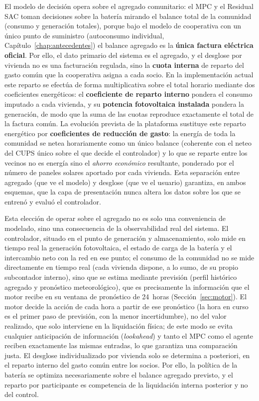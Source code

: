 \documentclass[12pt, a4paper, twoside]{report}
\begin{document}
El modelo de decisión opera sobre el agregado comunitario: el MPC y el Residual
SAC toman decisiones sobre la batería mirando el balance total de la comunidad
(consumo y generación totales), porque bajo el modelo de cooperativa con un único
punto de suministro (autoconsumo individual, Capítulo~\ref{chap:antecedentes}) el
balance agregado es la \textbf{única factura eléctrica oficial}. Por ello, el dato
primario del sistema es el agregado, y el desglose por vivienda no es una
facturación regulada, sino la \textbf{cuota interna} de reparto del gasto común
que la cooperativa asigna a cada socio. En la implementación actual este
reparto se efectúa de forma multiplicativa sobre el total horario mediante dos
coeficientes energéticos: el \textbf{coeficiente de reparto interno} pondera
el consumo imputado a cada vivienda, y su \textbf{potencia fotovoltaica
instalada} pondera la generación, de modo que la suma de las cuotas reproduce
exactamente el total de la factura común. La evolución prevista de la
plataforma sustituye este reparto energético por \textbf{coeficientes de
reducción de gasto}: la energía de toda la comunidad se netea horariamente
como un único balance (coherente con el neteo del CUPS único sobre el que
decide el controlador) y lo que se reparte entre los vecinos no es energía
sino el \emph{ahorro económico} resultante, ponderado por el número de paneles
solares aportado por cada vivienda. Esta separación entre agregado (que ve el
modelo) y desglose (que ve el usuario) garantiza, en ambos esquemas, que la
capa de presentación nunca altera los datos sobre los que se entrenó y evaluó
el controlador.

Esta elección de operar sobre el agregado no es solo una conveniencia de
modelado, sino una consecuencia de la observabilidad real del sistema. El
controlador, situado en el punto de generación y almacenamiento, solo mide en
tiempo real la generación fotovoltaica, el estado de carga de la batería y el
intercambio neto con la red en ese punto; el consumo de la comunidad no se mide
directamente en tiempo real (cada vivienda dispone, a lo sumo, de su propio
subcontador interno), sino que se estima mediante previsión (perfil histórico agregado
y pronóstico meteorológico), que es precisamente la información que el motor
recibe en su ventana de pronóstico de 24~horas (Sección~\ref{sec:motor}). El
motor decide la acción de cada hora a partir de ese pronóstico (la hora en curso
es el primer paso de previsión, con la menor incertidumbre), no del valor
realizado, que solo interviene en la liquidación física; de este modo se evita
cualquier anticipación de información (\textit{lookahead}) y tanto el MPC como el
agente reciben exactamente las mismas entradas, lo que garantiza una comparación
justa. El
desglose individualizado por vivienda solo se determina a posteriori, en el
reparto interno del gasto común entre los socios. Por ello, la política de la
batería se optimiza necesariamente sobre el balance agregado previsto, y el
reparto por participante es competencia de la liquidación interna posterior y no
del control.
\end{document}
